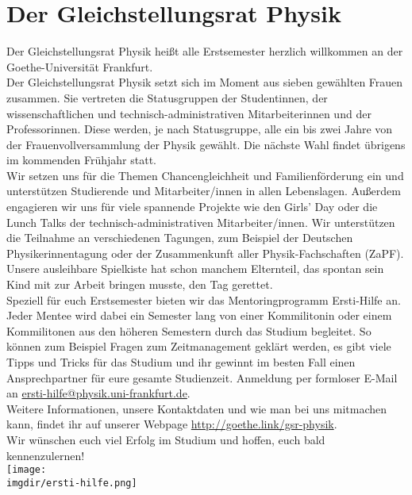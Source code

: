 \section{Der Gleichstellungsrat Physik}
Der Gleichstellungsrat Physik hei\ss t alle Erstsemester herzlich willkommen an der Goethe-Universität Frankfurt.\\
Der Gleichstellungsrat Physik setzt sich im Moment aus sieben gewählten
Frauen zusammen. Sie vertreten die Statusgruppen der Studentinnen, der
wissenschaftlichen und technisch-administrativen Mitarbeiterinnen und
der Professorinnen. Diese werden, je nach Statusgruppe, alle ein bis zwei Jahre von der Frauenvollversammlung der Physik gewählt. Die nächste Wahl findet übrigens im kommenden Frühjahr statt.\\
Wir setzen uns für die Themen Chancengleichheit und Familienförderung ein und unterstützen Studierende und Mitarbeiter/innen in allen Lebenslagen. Au\ss erdem engagieren wir uns für viele spannende Projekte wie den Girls' Day oder die Lunch Talks der technisch-administrativen Mitarbeiter/innen. Wir unterstützen die Teilnahme an verschiedenen Tagungen, zum Beispiel der Deutschen Physikerinnentagung oder der Zusammenkunft aller Physik-Fachschaften (ZaPF). Unsere ausleihbare Spielkiste hat schon manchem Elternteil, das spontan sein Kind mit zur Arbeit bringen musste, den Tag gerettet.\\
Speziell für euch Erstsemester bieten wir das Mentoringprogramm Ersti-Hilfe an. Jeder Mentee wird dabei ein Semester lang von einer Kommilitonin oder einem Kommilitonen aus den höheren Semestern durch das Studium begleitet. So können zum Beispiel Fragen zum Zeitmanagement geklärt werden, es gibt viele Tipps und Tricks für das Studium und ihr gewinnt im besten Fall einen Ansprechpartner für eure gesamte Studienzeit. Anmeldung per formloser E-Mail an \url{ersti-hilfe@physik.uni-frankfurt.de}.\\
Weitere Informationen, unsere Kontaktdaten und wie man bei uns mitmachen kann, findet ihr auf unserer Webpage \url{http://goethe.link/gsr-physik}.\\
Wir wünschen euch viel Erfolg im Studium und hoffen, euch bald kennenzulernen!\\
\texttt{[image: \\imgdir/ersti-hilfe.png]}